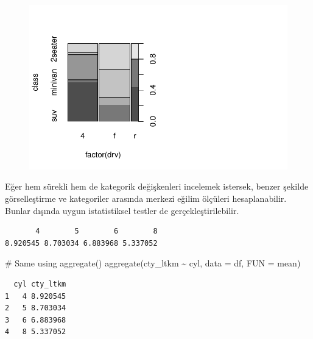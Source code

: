 \documentclass[
  letterpaper,
  DIV=11,
  numbers=noendperiod]{scrreprt}
\newenvironment{Shaded}{\begin{snugshade}}{\end{snugshade}}
\newcommand{\AttributeTok}[1]{\textcolor[rgb]{0.40,0.45,0.13}{#1}}
\newcommand{\CommentTok}[1]{\textcolor[rgb]{0.37,0.37,0.37}{#1}}
\newcommand{\FunctionTok}[1]{\textcolor[rgb]{0.28,0.35,0.67}{#1}}
\newcommand{\NormalTok}[1]{\textcolor[rgb]{0.00,0.23,0.31}{#1}}
\newcommand{\SpecialCharTok}[1]{\textcolor[rgb]{0.37,0.37,0.37}{#1}}
\begin{document}
\begin{figure}[H]

{\centering \includegraphics{data_analysis_files/figure-pdf/unnamed-chunk-3-4.pdf}

}

\end{figure}

Eğer hem sürekli hem de kategorik değişkenleri incelemek istersek,
benzer şekilde görselleştirme ve kategoriler arasında merkezi eğilim
ölçüleri hesaplanabilir. Bunlar dışında uygun istatistiksel testler de
gerçekleştirilebilir.

\begin{Shaded}
\end{Shaded}

\begin{verbatim}
       4        5        6        8 
8.920545 8.703034 6.883968 5.337052 
\end{verbatim}

\begin{Shaded}
\begin{Highlighting}[]
\CommentTok{\# Same using aggregate()}
\FunctionTok{aggregate}\NormalTok{(cty\_ltkm }\SpecialCharTok{\textasciitilde{}}\NormalTok{ cyl, }\AttributeTok{data =}\NormalTok{ df, }\AttributeTok{FUN =}\NormalTok{ mean)}
\end{Highlighting}
\end{Shaded}

\begin{verbatim}
  cyl cty_ltkm
1   4 8.920545
2   5 8.703034
3   6 6.883968
4   8 5.337052
\end{verbatim}
\end{document}
